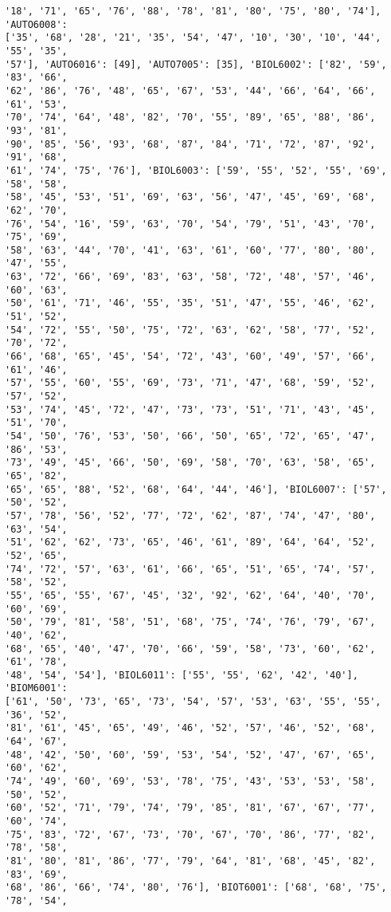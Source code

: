 \documentclass[11pt]{article}
\begin{document}
\begin{Verbatim}[commandchars=\\\{\}]
'18', '71', '65', '76', '88', '78', '81', '80', '75', '80', '74'], 'AUTO6008':
['35', '68', '28', '21', '35', '54', '47', '10', '30', '10', '44', '55', '35',
'57'], 'AUTO6016': [49], 'AUTO7005': [35], 'BIOL6002': ['82', '59', '83', '66',
'62', '86', '76', '48', '65', '67', '53', '44', '66', '64', '66', '61', '53',
'70', '74', '64', '48', '82', '70', '55', '89', '65', '88', '86', '93', '81',
'90', '85', '56', '93', '68', '87', '84', '71', '72', '87', '92', '91', '68',
'61', '74', '75', '76'], 'BIOL6003': ['59', '55', '52', '55', '69', '58', '58',
'58', '45', '53', '51', '69', '63', '56', '47', '45', '69', '68', '62', '70',
'76', '54', '16', '59', '63', '70', '54', '79', '51', '43', '70', '75', '69',
'58', '63', '44', '70', '41', '63', '61', '60', '77', '80', '80', '47', '55',
'63', '72', '66', '69', '83', '63', '58', '72', '48', '57', '46', '60', '63',
'50', '61', '71', '46', '55', '35', '51', '47', '55', '46', '62', '51', '52',
'54', '72', '55', '50', '75', '72', '63', '62', '58', '77', '52', '70', '72',
'66', '68', '65', '45', '54', '72', '43', '60', '49', '57', '66', '61', '46',
'57', '55', '60', '55', '69', '73', '71', '47', '68', '59', '52', '57', '52',
'53', '74', '45', '72', '47', '73', '73', '51', '71', '43', '45', '51', '70',
'54', '50', '76', '53', '50', '66', '50', '65', '72', '65', '47', '86', '53',
'73', '49', '45', '66', '50', '69', '58', '70', '63', '58', '65', '65', '82',
'65', '65', '88', '52', '68', '64', '44', '46'], 'BIOL6007': ['57', '50', '52',
'57', '78', '56', '52', '77', '72', '62', '87', '74', '47', '80', '63', '54',
'51', '62', '62', '73', '65', '46', '61', '89', '64', '64', '52', '52', '65',
'74', '72', '57', '63', '61', '66', '65', '51', '65', '74', '57', '58', '52',
'55', '65', '55', '67', '45', '32', '92', '62', '64', '40', '70', '60', '69',
'50', '79', '81', '58', '51', '68', '75', '74', '76', '79', '67', '40', '62',
'68', '65', '40', '47', '70', '66', '59', '58', '73', '60', '62', '61', '78',
'48', '54', '54'], 'BIOL6011': ['55', '55', '62', '42', '40'], 'BIOM6001':
['61', '50', '73', '65', '73', '54', '57', '53', '63', '55', '55', '36', '52',
'81', '61', '45', '65', '49', '46', '52', '57', '46', '52', '68', '64', '67',
'48', '42', '50', '60', '59', '53', '54', '52', '47', '67', '65', '60', '62',
'74', '49', '60', '69', '53', '78', '75', '43', '53', '53', '58', '50', '52',
'60', '52', '71', '79', '74', '79', '85', '81', '67', '67', '77', '60', '74',
'75', '83', '72', '67', '73', '70', '67', '70', '86', '77', '82', '78', '58',
'81', '80', '81', '86', '77', '79', '64', '81', '68', '45', '82', '83', '69',
'68', '86', '66', '74', '80', '76'], 'BIOT6001': ['68', '68', '75', '78', '54',

\end{Verbatim}
\end{document}
